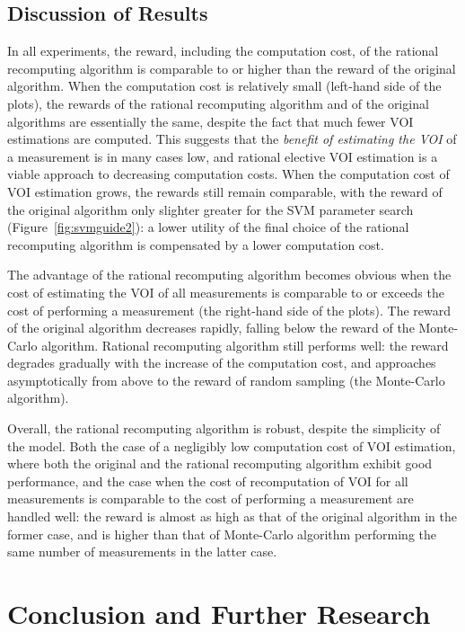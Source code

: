 \subsection{Discussion of Results}

In all experiments, the reward, including the computation cost, of the
rational recomputing algorithm is comparable to or higher than the
reward of the original algorithm. When the computation cost is
relatively small (left-hand side of the plots), the rewards of the
rational recomputing algorithm and of the original algorithms are
essentially the same, despite the fact that much fewer VOI estimations are
computed. This suggests that the \textit{benefit of estimating the VOI}
of a measurement is in many cases low, and rational elective VOI
estimation is a viable approach to decreasing computation costs.
When the computation cost of VOI estimation grows, the rewards still
remain comparable, with the reward of the original algorithm only
slighter greater for the SVM parameter search
(Figure~\ref{fig:svmguide2}): a lower utility of the final choice of the
rational recomputing algorithm is compensated by a lower computation
cost. 

The advantage of the rational recomputing algorithm becomes obvious
when the cost of estimating the VOI of all measurements is comparable
to or exceeds the cost of performing a measurement (the right-hand side of
the plots). The reward of the original algorithm decreases rapidly,
falling below the reward of the Monte-Carlo algorithm. Rational
recomputing algorithm still performs well: the reward degrades
gradually with the increase of the computation cost, and approaches
asymptotically from above to the reward of random sampling (the
Monte-Carlo algorithm). 

Overall, the rational recomputing algorithm is robust, despite the
simplicity of the model. Both the case of a negligibly low computation
cost of VOI estimation, where both the original and the rational
recomputing algorithm exhibit good performance, and the case when the
cost of recomputation of VOI for all measurements is comparable to the
cost of performing a measurement are handled well: the reward is
almost as high as that of the original algorithm in the former case, and is
higher than that of Monte-Carlo algorithm performing the same number of
measurements in the latter case.

\section{Conclusion and Further Research}
\label{sec:raticomp-conclusion}

